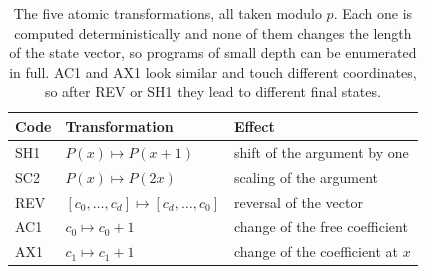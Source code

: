 \begin{table}[!tbh]
\centering\footnotesize\setlength{\tabcolsep}{4pt}
\begin{tabular}{|l|l|p{.34\linewidth}|}
\hline
\textbf{Code} & \textbf{Transformation} & \textbf{Effect} \\
\hline
SH1 & $P(x) \mapsto P(x+1)$ & shift of the argument by one \\ \hline
SC2 & $P(x) \mapsto P(2x)$ & scaling of the argument \\ \hline
REV & $[c_0, \ldots, c_d] \mapsto [c_d, \ldots, c_0]$ & reversal of the vector \\ \hline
AC1 & $c_0 \mapsto c_0 + 1$ & change of the free coefficient \\ \hline
AX1 & $c_1 \mapsto c_1 + 1$ & change of the coefficient at $x$ \\ \hline
\end{tabular}
\caption{The five atomic transformations, all taken modulo $p$. Each one is
computed deterministically and none of them changes the length of the state
vector, so programs of small depth can be enumerated in full. AC1 and AX1 look
similar and touch different coordinates, so after REV or SH1 they lead to
different final states.}
\label{tab:ops}
\end{table}
